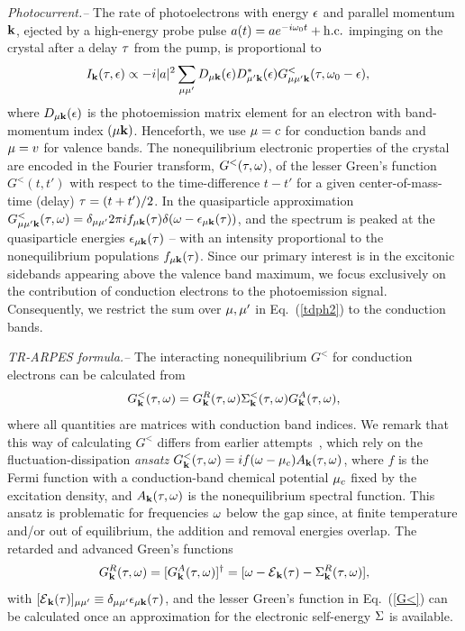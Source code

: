 \documentclass[twocolumn,aps,a4paper,superscriptaddress]{revtex4-2}
\begin{document}
{\em Photocurrent.--}
The rate of photoelectrons with energy $\e$ and parallel
momentum $\blk$, ejected by a high-energy probe
pulse $a(t)=ae^{-i\w_{0}t}+{\rm h.c.}$
impinging on the crystal after a delay $\t$ from the pump, is
proportional to~\cite{freericks_theoretical_2009,perfetto_first-principles_2016}
\begin{align}
I_{\blk}(\t,\e)&\propto-i|a|^{2}\sum_{\m\m'}
D_{\m\blk}(\e)D^{\ast}_{\m'\blk}(\e)
G^{<}_{\m\m'\blk}(\t,\w_{0}-\e),
\label{tdph2}
\end{align}
where  $D_{\m\blk}(\e)$ is the
photoemission matrix element for an electron
with band-momentum index $(\m\blk)$.
Henceforth, we use $\m=c$ for conduction bands and $\m=v$ for valence
bands. The nonequilibrium electronic
properties of the crystal are encoded in the Fourier transform,
$G^{<}(\t,\w)$,
of the lesser Green's function $G^{<}(t,t')$ with respect to the
time-difference $t-t'$ for a given center-of-mass-time (delay) $\t=(t+t')/2$.
In the quasiparticle approximation
$G^{<}_{\m\m'\blk}(\t,\w)=\d_{\m\m'}2\p i
f_{\m\blk}(\t)\d(\w-\e_{\m\blk}(\t))$, and the spectrum is peaked at
the quasiparticle energies $\e_{\m\blk}(\t)$ -- with an intensity
proportional to the
nonequilibrium populations $f_{\m\blk}(\t)$.
Since our primary interest is in the excitonic sidebands appearing
above the valence band maximum,
we  focus exclusively on the contribution of conduction electrons  to
the photoemission signal. Consequently, we restrict
the sum over $\m,\m'$ in Eq.~(\ref{tdph2}) to the conduction bands.

{\em TR-ARPES formula.--}
The interacting
nonequilibrium $G^{<}$ for conduction electrons can be calculated
from~\cite{svl-book_2025}
\begin{align}
G^{<}_{\blk}(\t,\w)=G^{R}_{\blk}(\t,\w)\S^{<}_{\blk}(\t,\w)G^{A}_{\blk}(\t,\w),
\label{G<}
\end{align}
where all quantities are matrices with conduction band indices.
We remark that this way of calculating $G^{<}$
differs from
earlier
attempts~\cite{perfetto_first-principles_2016,steinhoff_exciton_2017}, which
rely on the fluctuation-dissipation {\em ansatz}
$G^{<}_{\blk}(\t,\w)=i f(\w-\m_{c})A_{\blk}(\t,\w)$, where $f$ is the Fermi
function with a conduction-band
chemical potential $\m_{c}$ fixed by the excitation density,
and $A_{\blk}(\t,\w)$ is the nonequilibrium spectral function. This
ansatz is problematic for frequencies $\w$ below the gap since, at finite
temperature and/or out of
equilibrium, the addition and removal energies
overlap.
The retarded and advanced Green's functions
\begin{align}
G^{R}_{\blk}(\t,\w)=[G^{A}_{\blk}(\t,\w)]^{\dag}=[\w-\callE_{\blk}(\t)-\S^{R}_{\blk}(\t,\w)],
\end{align}
with $[\callE_{\blk}(\t)]_{\m\m'}\equiv \d_{\m\m'}\e_{\m\blk}(\t)$,
and the lesser
Green's function in Eq.~(\ref{G<}) can be calculated once an approximation for the
electronic self-energy $\S$ is available.
\end{document}
